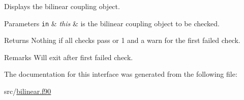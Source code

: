 Displays the bilinear coupling object. 


\begin{DoxyParams}[1]{Parameters}
\mbox{\tt in}  & {\em this} & is the bilinear coupling object to be checked. \\
\hline
\end{DoxyParams}
\begin{DoxyReturn}{Returns}
Nothing if all checks pass or 1 and a warn for the first failed check. 
\end{DoxyReturn}
\begin{DoxyRemark}{Remarks}
Will exit after first failed check. 
\end{DoxyRemark}


The documentation for this interface was generated from the following file\+:\begin{DoxyCompactItemize}
\item 
src/\hyperlink{bilinear_8f90}{bilinear.\+f90}\end{DoxyCompactItemize}
